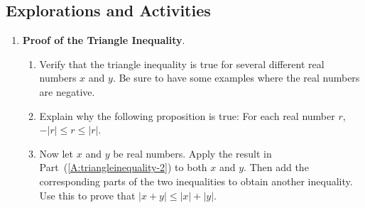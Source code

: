 \subsection*{Explorations and Activities}
\setcounter{oldenumi}{\theenumi}
\begin{enumerate} \setcounter{enumi}{\theoldenumi}
\item \textbf{Proof of the Triangle Inequality}.  \label{exer:triangleineq}
\begin{enumerate}
\item  Verify that the triangle inequality is true for several different real numbers $x$ and 
$y$.  Be sure to have some examples where the real numbers are negative.

\item Explain why the following proposition is true:
For each real number $r$, $- \left| r \right| \leq r \leq \left| r \right|$.
\label{A:triangleinequality-2}%

\item Now let $x$ and $y$ be real numbers.  Apply the result in 
Part~(\ref{A:triangleinequality-2}) to both $x$ and $y$.  Then add the corresponding parts of the two inequalities to obtain another inequality.  Use this to prove that 
$\left| x + y \right| \leq \left| x \right| + \left| y \right|$.
\end{enumerate}

\end{enumerate}






%

